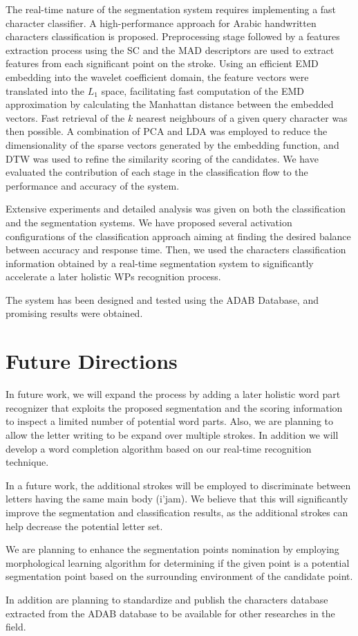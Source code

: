 The real-time nature of the segmentation system requires implementing a fast character classifier.
A high-performance approach for Arabic handwritten characters classification is proposed.
Preprocessing stage followed by a features extraction process using the SC and the MAD descriptors are used to extract features from each significant point on the stroke.
Using an efficient EMD embedding into the wavelet coefficient domain, the feature vectors were translated into the $L_1$ space, facilitating fast computation of the EMD approximation by calculating the Manhattan distance between the embedded vectors.
Fast retrieval of the $k$ nearest neighbours of a given query character was then possible.
A combination of PCA and LDA was employed to reduce the dimensionality of the sparse vectors generated by the embedding function, and DTW was used to refine the similarity scoring of the candidates.
We have evaluated the contribution of each stage in the classification flow to the performance and accuracy of the system.

Extensive experiments and detailed analysis was given on both the classification and the segmentation systems.
We have proposed several activation configurations of the classification approach aiming at finding the desired balance between accuracy and response time.
Then, we used the characters classification information obtained by a real-time segmentation system to significantly accelerate a later holistic WPs recognition process.

The system has been designed and tested using the ADAB Database, and promising results were obtained.

\section{Future Directions}
\label{sec:future_directions}

In future work, we will expand the process by adding a later holistic word part recognizer that exploits the proposed segmentation and the scoring information to inspect a limited number of potential word parts.
Also, we are planning to allow the letter writing to be expand over multiple strokes.
In addition we will develop a word completion algorithm based on our real-time recognition technique.

In a future work, the additional strokes will be employed to discriminate between letters having the same main body (i'jam).
We believe that this will significantly improve the segmentation and classification results, as the additional strokes can help decrease the potential letter set.

We are planning to enhance the segmentation points nomination by employing morphological learning algorithm for determining if the given point is a potential segmentation point based on the surrounding environment of the candidate point. 

In addition are planning to standardize and publish the characters database extracted from the ADAB database to be available for other researches in the field.

%